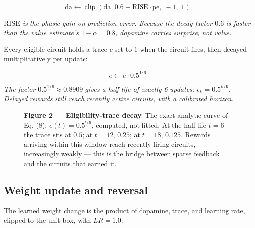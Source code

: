 \documentclass[11pt]{article}
\begin{document}
\begin{equation}
\mathrm{da} \leftarrow \operatorname{clip}(\mathrm{da}\cdot 0.6 + \mathrm{RISE}\cdot\mathrm{pe},\; -1,\; 1)
\tag{7}
\end{equation}

\noindent\emph{\(\mathrm{RISE}\) is the phasic gain on prediction error. Because the decay factor \(0.6\) is faster than the value estimate's \(1-\alpha = 0.8\), dopamine carries \emph{surprise}, not value.}

Every eligible circuit holds a trace \(e\) set to \(1\) when the circuit fires, then decayed multiplicatively per update:

\begin{equation}
e \leftarrow e\cdot 0.5^{1/6}
\tag{8}
\end{equation}

\noindent\emph{The factor \(0.5^{1/6} \approx 0.8909\) gives a \emph{half-life of exactly 6 updates}: \(e_k = 0.5^{k/6}\). Delayed rewards still reach recently active circuits, with a calibrated horizon.}

\begin{figure}[htbp]
\centering
{}
\caption*{\textbf{Figure 2 — Eligibility-trace decay.} The exact analytic curve of Eq. (8): \(e(t) = 0.5^{t/6}\), computed, not fitted. At the half-life \(t=6\) the trace sits at \(0.5\); at \(t=12\), \(0.25\); at \(t=18\), \(0.125\). Rewards arriving within this window reach recently firing circuits, increasingly weakly — this is the bridge between sparse feedback and the circuits that earned it.}
\end{figure}

\subsection{Weight update and reversal}

The learned weight change is the product of dopamine, trace, and learning rate, clipped to the unit box, with \(LR = 1.0\):
\end{document}

